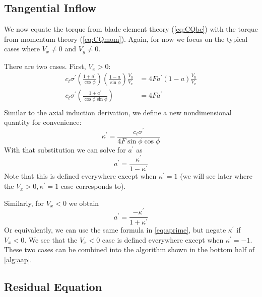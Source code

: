 \subsection{Tangential Inflow}

We now equate the torque from blade element theory (\cref{eq:CQbe}) with the torque from momentum theory (\cref{eq:CQmom}).  Again, for now we focus on the typical cases where $V_x \ne 0$ and $V_y \ne 0$.

There are two cases.  First, $V_x > 0$:
\begin{equation}
\begin{aligned}
 c_t \sigma^\prime \left(\frac{1 + a^\prime}{\cos\phi}\right)\left(\frac{1 - a}{\sin\phi}\right)\frac{V_y}{V_x} &= 4 F a^\prime (1 - a) \frac{V_y}{V_x}\\
 c_t \sigma^\prime \left(\frac{1 + a^\prime}{\cos\phi\sin\phi}\right)&= 4 F a^\prime \\
\end{aligned}
\end{equation}
Similar to the axial induction derivation, we define a new nondimensional quantity for convenience:
\begin{equation}
    \kappa^\prime = \frac{c_t \sigma^\prime}{4 F \sin\phi \cos\phi}
\end{equation}
With that substitution we can solve for $a^\prime$ as
\begin{equation}
    a^\prime = \frac{\kappa^\prime}{1 - \kappa^\prime}
    \label{eq:aprime}
\end{equation}
Note that this is defined everywhere except when $\kappa^\prime = 1$ (we will see later where the $V_x > 0, \kappa^\prime = 1$ case corresponds to).

Similarly, for $V_x < 0$ we obtain
\begin{equation}
    a^\prime = \frac{-\kappa^\prime}{1 + \kappa^\prime}
\end{equation}
Or equivalently, we can use the same formula in \cref{eq:aprime}, but negate $\kappa^\prime$ if $V_x < 0$.  We see that the $V_x < 0$ case is defined everywhere except when $\kappa^\prime = -1$.  These two cases can be combined into the algorithm shown in the bottom half of \cref{alg:aap}.





\subsection{Residual Equation}

